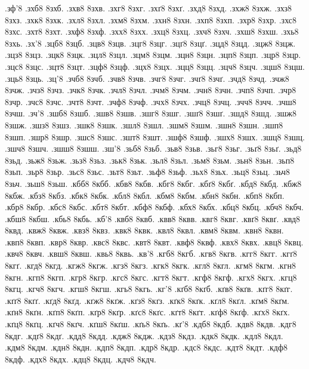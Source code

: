 {.зф'8
.зхб8
8зхб.
.зхв8
8зхв.
.зхг8
8зхг.
.зхґ8
8зхґ.
.зхд8
8зхд.
.зхж8
8зхж.
.зхз8
8зхз.
.зхк8
8зхк.
.зхл8
8зхл.
.зхм8
8зхм.
.зхн8
8зхн.
.зхп8
8зхп.
.зхр8
8зхр.
.зхс8
8зхс.
.зхт8
8зхт.
.зхф8
8зхф.
.зхх8
8зхх.
.зхц8
8зхц.
.зхч8
8зхч.
.зхш8
8зхш.
.зхь8
8зхь.
.зх'8
.зцб8
8зцб.
.зцв8
8зцв.
.зцг8
8зцг.
.зцґ8
8зцґ.
.зцд8
8зцд.
.зцж8
8зцж.
.зцз8
8зцз.
.зцк8
8зцк.
.зцл8
8зцл.
.зцм8
8зцм.
.зцн8
8зцн.
.зцп8
8зцп.
.зцр8
8зцр.
.зцс8
8зцс.
.зцт8
8зцт.
.зцф8
8зцф.
.зцх8
8зцх.
.зцц8
8зцц.
.зцч8
8зцч.
.зцш8
8зцш.
.зць8
8зць.
.зц'8
.зчб8
8зчб.
.зчв8
8зчв.
.зчг8
8зчг.
.зчґ8
8зчґ.
.зчд8
8зчд.
.зчж8
8зчж.
.зчз8
8зчз.
.зчк8
8зчк.
.зчл8
8зчл.
.зчм8
8зчм.
.зчн8
8зчн.
.зчп8
8зчп.
.зчр8
8зчр.
.зчс8
8зчс.
.зчт8
8зчт.
.зчф8
8зчф.
.зчх8
8зчх.
.зчц8
8зчц.
.зчч8
8зчч.
.зчш8
8зчш.
.зч'8
.зшб8
8зшб.
.зшв8
8зшв.
.зшг8
8зшг.
.зшґ8
8зшґ.
.зшд8
8зшд.
.зшж8
8зшж.
.зшз8
8зшз.
.зшк8
8зшк.
.зшл8
8зшл.
.зшм8
8зшм.
.зшн8
8зшн.
.зшп8
8зшп.
.зшр8
8зшр.
.зшс8
8зшс.
.зшт8
8зшт.
.зшф8
8зшф.
.зшх8
8зшх.
.зшц8
8зшц.
.зшч8
8зшч.
.зшш8
8зшш.
.зш'8
.зьб8
8зьб.
.зьв8
8зьв.
.зьг8
8зьг.
.зьґ8
8зьґ.
.зьд8
8зьд.
.зьж8
8зьж.
.зьз8
8зьз.
.зьк8
8зьк.
.зьл8
8зьл.
.зьм8
8зьм.
.зьн8
8зьн.
.зьп8
8зьп.
.зьр8
8зьр.
.зьс8
8зьс.
.зьт8
8зьт.
.зьф8
8зьф.
.зьх8
8зьх.
.зьц8
8зьц.
.зьч8
8зьч.
.зьш8
8зьш.
.кбб8
8кбб.
.кбв8
8кбв.
.кбг8
8кбг.
.кбґ8
8кбґ.
.кбд8
8кбд.
.кбж8
8кбж.
.кбз8
8кбз.
.кбк8
8кбк.
.кбл8
8кбл.
.кбм8
8кбм.
.кбн8
8кбн.
.кбп8
8кбп.
.кбр8
8кбр.
.кбс8
8кбс.
.кбт8
8кбт.
.кбф8
8кбф.
.кбх8
8кбх.
.кбц8
8кбц.
.кбч8
8кбч.
.кбш8
8кбш.
.кбь8
8кбь.
.кб'8
.квб8
8квб.
.квв8
8квв.
.квг8
8квг.
.квґ8
8квґ.
.квд8
8квд.
.квж8
8квж.
.квз8
8квз.
.квк8
8квк.
.квл8
8квл.
.квм8
8квм.
.квн8
8квн.
.квп8
8квп.
.квр8
8квр.
.квс8
8квс.
.квт8
8квт.
.квф8
8квф.
.квх8
8квх.
.квц8
8квц.
.квч8
8квч.
.квш8
8квш.
.квь8
8квь.
.кв'8
.кгб8
8кгб.
.кгв8
8кгв.
.кгг8
8кгг.
.кгґ8
8кгґ.
.кгд8
8кгд.
.кгж8
8кгж.
.кгз8
8кгз.
.кгк8
8кгк.
.кгл8
8кгл.
.кгм8
8кгм.
.кгн8
8кгн.
.кгп8
8кгп.
.кгр8
8кгр.
.кгс8
8кгс.
.кгт8
8кгт.
.кгф8
8кгф.
.кгх8
8кгх.
.кгц8
8кгц.
.кгч8
8кгч.
.кгш8
8кгш.
.кгь8
8кгь.
.кг'8
.кґб8
8кґб.
.кґв8
8кґв.
.кґг8
8кґг.
.кґґ8
8кґґ.
.кґд8
8кґд.
.кґж8
8кґж.
.кґз8
8кґз.
.кґк8
8кґк.
.кґл8
8кґл.
.кґм8
8кґм.
.кґн8
8кґн.
.кґп8
8кґп.
.кґр8
8кґр.
.кґс8
8кґс.
.кґт8
8кґт.
.кґф8
8кґф.
.кґх8
8кґх.
.кґц8
8кґц.
.кґч8
8кґч.
.кґш8
8кґш.
.кґь8
8кґь.
.кґ'8
.кдб8
8кдб.
.кдв8
8кдв.
.кдг8
8кдг.
.кдґ8
8кдґ.
.кдд8
8кдд.
.кдж8
8кдж.
.кдз8
8кдз.
.кдк8
8кдк.
.кдл8
8кдл.
.кдм8
8кдм.
.кдн8
8кдн.
.кдп8
8кдп.
.кдр8
8кдр.
.кдс8
8кдс.
.кдт8
8кдт.
.кдф8
8кдф.
.кдх8
8кдх.
.кдц8
8кдц.
.кдч8
8кдч.
}
